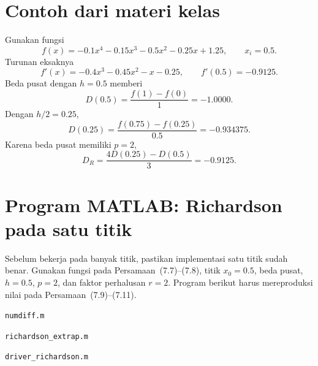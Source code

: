 \documentclass[book,english,noindex,lean,nobackpage,nocopyright,noupdate,nofiglist,notablist]{enacom}
\newcommand{\MatlabFile}[1]{\par\smallskip\noindent\texttt{#1}\par}
\begin{document}
\section{Contoh dari materi kelas}
Gunakan fungsi
\begin{equation}
f(x)=-0.1x^4-0.15x^3-0.5x^2-0.25x+1.25,
\qquad x_i=0.5.
\label{eq:poly-class}
\end{equation}
Turunan eksaknya
\begin{equation}
f'(x)=-0.4x^3-0.45x^2-x-0.25,
\qquad f'(0.5)=-0.9125.
\label{eq:poly-derivative}
\end{equation}
Beda pusat dengan $h=0.5$ memberi
\begin{equation}
D(0.5)=\frac{f(1)-f(0)}{1}=-1.0000.
\label{eq:class-dh}
\end{equation}
Dengan $h/2=0.25$,
\begin{equation}
D(0.25)=\frac{f(0.75)-f(0.25)}{0.5}=-0.934375.
\label{eq:class-dh2}
\end{equation}
Karena beda pusat memiliki $p=2$,
\begin{equation}
D_R=\frac{4D(0.25)-D(0.5)}{3}=-0.9125.
\label{eq:class-rich}
\end{equation}


\section{Program MATLAB: Richardson pada satu titik}
Sebelum bekerja pada banyak titik, pastikan implementasi satu titik sudah benar. Gunakan fungsi pada
Persamaan~(7.7)--(7.8), titik $x_0=0.5$, beda pusat, $h=0.5$, $p=2$, dan faktor perhalusan $r=2$.
Program berikut harus mereproduksi nilai pada Persamaan~(7.9)--(7.11).

\MatlabFile{numdiff.m}


\MatlabFile{richardson\_extrap.m}


\MatlabFile{driver\_richardson.m}

\end{document}
